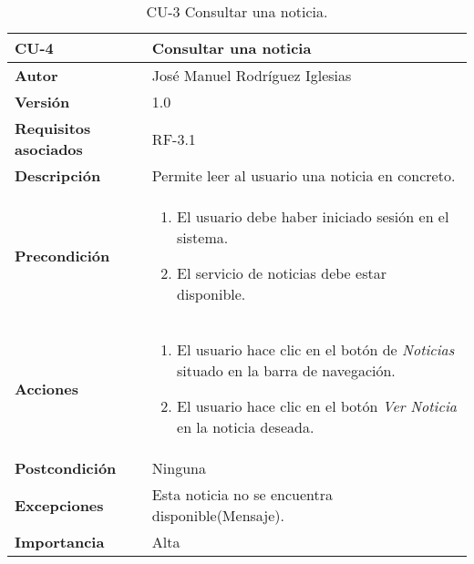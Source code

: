 \begin{table}[h]
	\centering
	\begin{tabularx}{\linewidth}{ p{} p{} }
		\toprule
		\textbf{CU-4}    & \textbf{Consultar una noticia}\\
		\toprule
            \textbf{Autor}                & José Manuel Rodríguez Iglesias \\
		\textbf{Versión}              & 1.0    \\
		\textbf{Requisitos asociados} & RF-3.1 \\
		\textbf{Descripción}          & Permite leer al usuario una noticia en concreto. \\
		\textbf{Precondición}         &  
            \begin{enumerate}
			\def\labelenumi{\arabic{enumi}.}
			\tightlist
			\item El usuario debe haber iniciado sesión en el sistema.
			\item El servicio de noticias debe estar disponible.
		\end{enumerate}\\
    
  
		\textbf{Acciones}             &
		\begin{enumerate}
			\def\labelenumi{\arabic{enumi}.}
			\tightlist
			\item El usuario hace clic en el botón de \textit{Noticias} situado en la barra de navegación.
			\item El usuario hace clic en el botón \textit{Ver Noticia} en la noticia deseada.
		\end{enumerate}\\
		\textbf{Postcondición}        & Ninguna \\
		\textbf{Excepciones}          & Esta noticia no se encuentra disponible(Mensaje). \\
		\textbf{Importancia}          & Alta\\
		\bottomrule
	\end{tabularx}
	\caption{CU-3 Consultar una noticia.}
\end{table}

